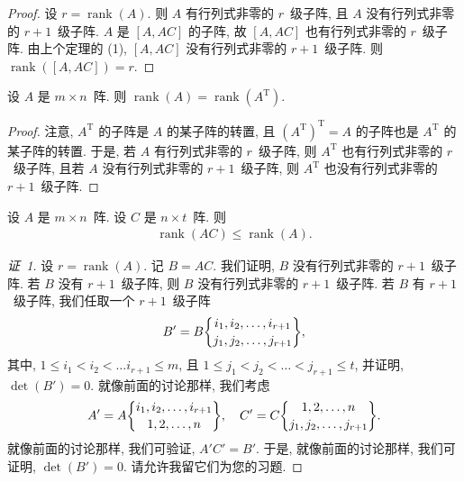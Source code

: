 \documentclass[../libro.tex]{subfiles}
\begin{document}
\begin{proof}
    设 \(r = \operatorname{rank} {(A)}\).
    则 \(A\) 有行列式非零的 \(r\)~级子阵,
    且 \(A\) 没有行列式非零的 \(r + 1\)~级子阵.
    \(A\) 是 \([A, AC]\) 的子阵,
    故 \([A, AC]\) 也有行列式非零的 \(r\)~级子阵.
    由上个定理的 (1),
    \([A, AC]\) 没有行列式非零的 \(r + 1\)~级子阵.
    则 \(\operatorname{rank} {([A, AC])} = r\).
\end{proof}


\begin{theorem}
    设 \(A\) 是 \(m \times n\)~阵.
    则 \(\operatorname{rank} {(A)}
    = \operatorname{rank} {(A^{\mathrm{T}})}\).
\end{theorem}

\begin{proof}
    注意, \(A^{\mathrm{T}}\) 的子阵是 \(A\) 的某子阵的转置,
    且 \((A^{\mathrm{T}})^{\mathrm{T}} = A\)
    的子阵也是 \(A^{\mathrm{T}}\) 的某子阵的转置.
    于是, 若 \(A\) 有行列式非零的 \(r\)~级子阵,
    则 \(A^{\mathrm{T}}\) 也有行列式非零的 \(r\)~级子阵,
    且若 \(A\) 没有行列式非零的 \(r + 1\)~级子阵,
    则 \(A^{\mathrm{T}}\) 也没有行列式非零的 \(r + 1\)~级子阵.
\end{proof}

\begin{theorem}
    设 \(A\) 是 \(m \times n\)~阵.
    设 \(C\) 是 \(n \times t\)~阵.
    则
    \begin{align*}
        \operatorname{rank} {(AC)}
        \leq \operatorname{rank} {(A)}.
    \end{align*}
\end{theorem}

\begin{proof}[证~1]
    设 \(r = \operatorname{rank} {(A)}\).
    记 \(B = A C\).
    我们证明, \(B\) 没有行列式非零的 \(r + 1\)~级子阵.
    若 \(B\) 没有 \(r + 1\)~级子阵,
    则 \(B\) 没有行列式非零的 \(r + 1\)~级子阵.
    若 \(B\) 有 \(r + 1\)~级子阵,
    我们任取一个 \(r + 1\)~级子阵
    \begin{align*}
        B' =
        B\submat{i_1,i_2,\dots,i_{r+1}}{j_1,j_2,\dots,j_{r+1}},
    \end{align*}
    其中, \(1 \leq i_1 < i_2 < \dots i_{r+1} \leq m\),
    且 \(1 \leq j_1 < j_2 < \dots < j_{r+1} \leq t\),
    并证明, \(\det {(B')} = 0\).
    就像前面的讨论那样, 我们考虑
    \begin{align*}
        A' = A\submat{i_1,i_2,\dots,i_{r+1}}{1,2,\dots,n},
        \quad
        C' = C\submat{1,2,\dots,n}{j_1,j_2,\dots,j_{r+1}}.
    \end{align*}
    就像前面的讨论那样, 我们可验证,
    \(A' C' = B'\).
    于是, 就像前面的讨论那样, 我们可证明,
    \(\det {(B')} = 0\).
    请允许我留它们为您的习题.
\end{proof}
\end{document}

